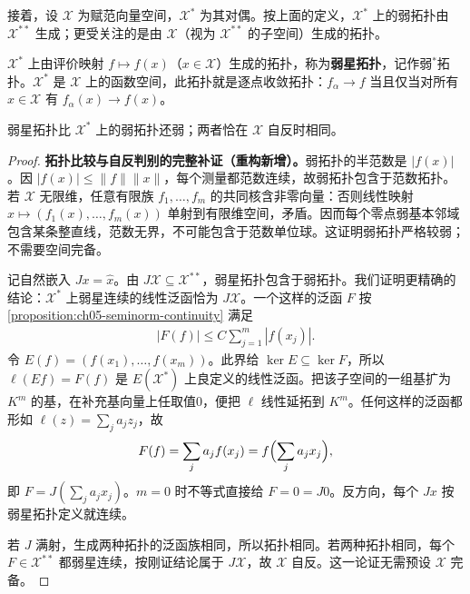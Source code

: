 \documentclass[../../main.tex]{subfiles}
\begin{document}
接着，设 $\mathcal X$ 为赋范向量空间，$\mathcal X^*$ 为其对偶。按上面的定义，$\mathcal X^*$ 上的弱拓扑由 $\mathcal X^{**}$ 生成；更受关注的是由 $\mathcal X$（视为 $\mathcal X^{**}$ 的子空间）生成的拓扑。
\begin{definition}[弱星拓扑]\label{definition:ch05-weak-star-topology}
$\mathcal X^*$ 上由评价映射 $f\mapsto f(x)$（$x\in\mathcal X$）生成的拓扑，称为\textbf{弱星拓扑}，记作弱$^*$拓扑。$\mathcal X^*$ 是 $\mathcal X$ 上的函数空间，此拓扑就是逐点收敛拓扑：$f_\alpha\to f$ 当且仅当对所有 $x\in\mathcal X$ 有 $f_\alpha(x)\to f(x)$。
\end{definition}
弱星拓扑比 $\mathcal X^*$ 上的弱拓扑还弱；两者恰在 $\mathcal X$ 自反时相同。
\begin{proof}
\textbf{拓扑比较与自反判别的完整补证（重构新增）。}弱拓扑的半范数是 $|f(x)|$。因 $|f(x)|\le\|f\|\|x\|$，每个测量都范数连续，故弱拓扑包含于范数拓扑。若 $\mathcal X$ 无限维，任意有限族 $f_1,\ldots,f_m$ 的共同核含非零向量：否则线性映射 $x\mapsto(f_1(x),\ldots,f_m(x))$ 单射到有限维空间，矛盾。因而每个零点弱基本邻域包含某条整直线，范数无界，不可能包含于范数单位球。这证明弱拓扑严格较弱；不需要空间完备。

记自然嵌入 $Jx=\widehat x$。由 $J\mathcal X\subseteq\mathcal X^{**}$，弱星拓扑包含于弱拓扑。我们证明更精确的结论：$\mathcal X^*$ 上弱星连续的线性泛函恰为 $J\mathcal X$。一个这样的泛函 $F$ 按\cref{proposition:ch05-seminorm-continuity} 满足
\begin{align*}
|F(f)|\le C\sum_{j=1}^m|f(x_j)|.
\end{align*}
令 $E(f)=(f(x_1),\ldots,f(x_m))$。此界给 $\ker E\subseteq\ker F$，所以 $\ell(Ef)=F(f)$ 是 $E(\mathcal X^*)$ 上良定义的线性泛函。把该子空间的一组基扩为 $K^m$ 的基，在补充基向量上任取值0，便把 $\ell$ 线性延拓到 $K^m$。任何这样的泛函都形如 $\ell(z)=\sum_j a_jz_j$，故
\begin{align*}
F(f)=\sum_j a_j f(x_j)=f\Bigl(\sum_j a_jx_j\Bigr),
\end{align*}
即 $F=J(\sum_j a_jx_j)$。$m=0$ 时不等式直接给 $F=0=J0$。反方向，每个 $Jx$ 按弱星拓扑定义就连续。

若 $J$ 满射，生成两种拓扑的泛函族相同，所以拓扑相同。若两种拓扑相同，每个 $F\in\mathcal X^{**}$ 都弱星连续，按刚证结论属于 $J\mathcal X$，故 $\mathcal X$ 自反。这一论证无需预设 $\mathcal X$ 完备。
\end{proof}
\end{document}
